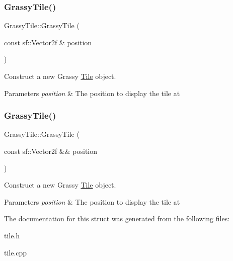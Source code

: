 \subsubsection{\texorpdfstring{GrassyTile()}{GrassyTile()}\hspace{0.1cm}{\footnotesize\ttfamily [1/2]}}
{\footnotesize\ttfamily Grassy\+Tile\+::\+Grassy\+Tile (\begin{DoxyParamCaption}\item[{const sf\+::\+Vector2f \&}]{position }\end{DoxyParamCaption})\hspace{0.3cm}{\ttfamily [explicit]}}



Construct a new Grassy \mbox{\hyperlink{classRose_1_1Tile}{Tile}} object. 


\begin{DoxyParams}{Parameters}
{\em position} & The position to display the tile at \\
\hline
\end{DoxyParams}
\mbox{\label{structRose_1_1GrassyTile_acd1aa8c780a09b87e0bb4b39a435c536}} 
\subsubsection{\texorpdfstring{GrassyTile()}{GrassyTile()}\hspace{0.1cm}{\footnotesize\ttfamily [2/2]}}
{\footnotesize\ttfamily Grassy\+Tile\+::\+Grassy\+Tile (\begin{DoxyParamCaption}\item[{const sf\+::\+Vector2f \&\&}]{position }\end{DoxyParamCaption})\hspace{0.3cm}{\ttfamily [explicit]}}



Construct a new Grassy \mbox{\hyperlink{classRose_1_1Tile}{Tile}} object. 


\begin{DoxyParams}{Parameters}
{\em position} & The position to display the tile at \\
\hline
\end{DoxyParams}


The documentation for this struct was generated from the following files\+:\begin{DoxyCompactItemize}
\item 
tile.\+h\item 
tile.\+cpp\end{DoxyCompactItemize}
